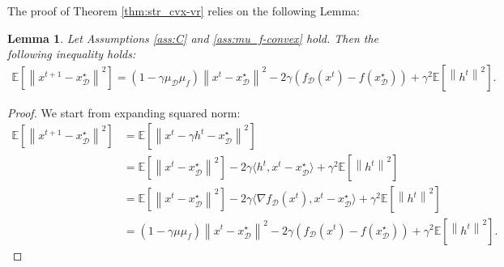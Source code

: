 \documentclass{article}
\newcommand{\bb}{\mathbb}
\newcommand{\cD}{\mathcal{D}}
\newcommand{\Exp}[1]{{\bb E}\left[#1\right]}
\newtheorem{lemma}{Lemma}
\theoremstyle{plain}
\newcommand{\tf}{f_{\mathcal{D}}}
\theoremstyle{plain}
\theoremstyle{definition}
\theoremstyle{remark}
\begin{document}
The proof of Theorem \ref{thm:str_cvx-vr} relies on the following Lemma:
\begin{lemma}
\label{lemma:contr-lsvrg}
	Let Assumptions \ref{ass:C} and \ref{ass:mu_f-convex} hold. Then the following inequality holds:
 \begin{align*}
   \Exp{\left\|x^{t+1} - x_\cD^\star\right\|^2}   = \left(1 - \gamma\mu_{\mathcal{D}}\mu_f\right)\left\|x^t - x_\cD^\star\right\|^2 -2\gamma\left(\tf(x^t) - f(x_\cD^\star)\right) + \gamma^2\Exp{\left\|h^t\right\|^2}.
 \end{align*}
\end{lemma}
\begin{proof}
We start from expanding squared norm:
	\begin{equation*}
		\begin{split}
			\Exp{\left\|x^{t+1} - x_\cD^\star\right\|^2} & = \Exp{\left\|x^t - \gamma h^t - x_\cD^\star\right\|^2}\\
			& = \Exp{\left\|x^t - x_\cD^\star\right\|^2} - 2\gamma \langle h^t, x^t - x_\cD^\star\rangle + \gamma^2\Exp{\left\|h^t\right\|^2}\\
			& = \Exp{\left\|x^t - x_\cD^\star\right\|^2} - 2\gamma \langle \nabla\tf(x^t) , x^t - x_\cD^\star\rangle + \gamma^2\Exp{\left\|h^t\right\|^2}\\
			& = \left(1 - \gamma\mu\mu_f\right)\left\|x^t - x_\cD^\star\right\|^2 -2\gamma\left(\tf(x^t) - f(x_\cD^\star)\right) + \gamma^2\Exp{\left\|h^t\right\|^2}.
		\end{split}
	\end{equation*}
\end{proof}
\end{document}
